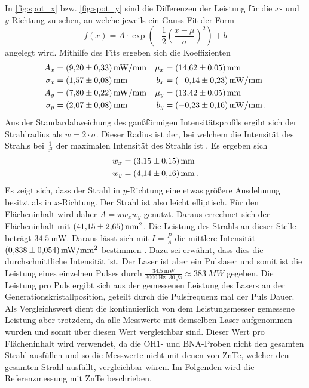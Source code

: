 In \autoref{fig:spot_x} bzw. \autoref{fig:spot_y} sind die Differenzen der Leistung für die $x$- und $y$-Richtung zu sehen,
an welche jeweils ein Gauss-Fit der Form
\begin{equation}
    f(x) = A\cdot \exp\left(-\frac{1}{2}\left(\frac{x-\mu}{\sigma}\right)^2\right) + b
\end{equation}
angelegt wird.
Mithilfe des Fits ergeben sich die Koeffizienten
\begin{align}
    A_x &= \SI{9.20+-0.33}{mW/mm} & \mu_x &= \SI{14.62+-0.05}{mm} \\
    \sigma_x &= \SI{1.57+-0.08}{mm} & b_x &= \SI{-0.14+-0.23}{mW/mm} \\
    A_y &= \SI{7.80+-0.22}{mW/mm} & \mu_y &= \SI{13.42+-0.05}{mm} \\
    \sigma_y &= \SI{2.07+-0.08}{mm} & b_y &= \SI{-0.23+-0.16}{mW/mm} \,.
\end{align}
Aus der Standardabweichung des gaußförmigen Intensitätsprofils ergibt sich der Strahlradius als $w=2\cdot\sigma $.
Dieser Radius ist der, bei welchem die Intensität des Strahls bei $\frac{1}{e^2}$ der maximalen Intensität des Strahls ist \cite{mohamed2019measurements}.
Es ergeben sich
\begin{align}
	w_x &= \SI{3.15+-0.15}{\milli\meter} \ \\
	w_y &= \SI{4.14+-0.16}{\milli\meter} \, .
\end{align}
Es zeigt sich, dass der Strahl in $y$-Richtung eine etwas größere Ausdehnung besitzt als in $x$‑Richtung. Der Strahl ist also leicht elliptisch.
Für den Flächeninhalt wird daher $A =\pi w_x w_y$ genutzt.
Daraus errechnet sich der Flächeninhalt mit $\SI{41.15+-2.65}{\milli\meter\squared}$.
Die Leistung des Strahls an dieser Stelle beträgt $\SI{34.5}{\milli\watt}$.
Daraus lässt sich mit $I= \frac{P}{A}$ die mittlere Intensität
$\SI{0.838+-0.054}{\milli\watt\per\milli\meter\squared}$ bestimmen \cite{mohamed2019measurements}.
Dazu sei erwähnt, dass dies die durchschnittliche Intensität ist.
Der Laser ist aber ein Pulslaser und somit ist die Leistung eines einzelnen Pulses 
durch $\frac{\SI{34.5}{\milli\watt}}{\SI{3000}{\hertz}\cdot \SI{30}{fs}}\approx \SI{383}{MW}$ gegeben.
Die Leistung pro Puls ergibt sich aus der gemessenen Leistung des Lasers an der Generationskristallposition, 
geteilt durch die Pulsfrequenz mal der Puls Dauer.
Als Vergleichswert dient die kontinuierlich von dem Leistungsmesser gemessene Leistung aber trotzdem, da alle Messwerte mit demselben Laser aufgenommen wurden und somit über diesen 
Wert vergleichbar sind.
Dieser Wert pro Flächeninhalt wird verwendet, da die OH1- und BNA-Proben nicht den gesamten Strahl ausfüllen und so die Messwerte 
nicht mit denen von ZnTe, welcher 
den gesamten Strahl ausfüllt, vergleichbar wären. 
Im Folgenden wird die Referenzmessung mit ZnTe beschrieben.


